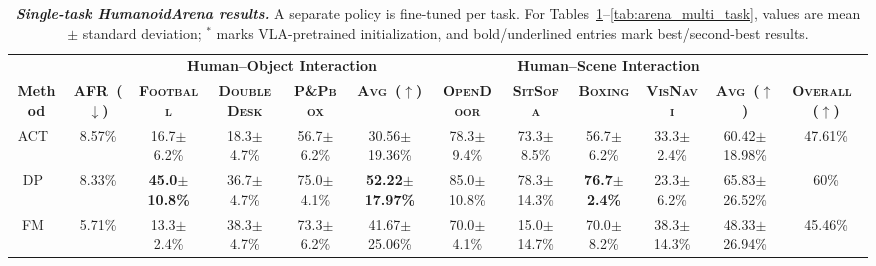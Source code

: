


  




\begin{table}[H]
  \caption{\textbf{\textit{Single-task HumanoidArena results.}} A separate policy is fine-tuned per task. For Tables~\ref{tab:arena_single_task}--\ref{tab:arena_multi_task}, values are mean $\pm$ standard deviation; $^{*}$ marks VLA-pretrained initialization, and bold/underlined entries mark best/second-best results.}
  \label{tab:arena_single_task}
  \centering
  \begin{adjustbox}{max width=\textwidth}
  \setlength{\tabcolsep}{4.2pt}
  \renewcommand{\arraystretch}{1.08}

  \begin{tabular}{cccccc|cccccc}
  \toprule
  & &
  \multicolumn{4}{c|}{\textbf{Human--Object Interaction}} &
  \multicolumn{5}{c}{\textbf{Human--Scene Interaction}} & \\
  \cmidrule(lr){3-6}
  \cmidrule(lr){7-11}

  \multirow{-2}{*}{\textbf{Method}} &
  \multirow{-2}{*}{\textbf{AFR~($\downarrow$)}} &
  \textbf{\textsc{Football}} &
  \textbf{\textsc{DoubleDesk}} &
  \textbf{\textsc{P\&Pbox}} &
  \textbf{\textsc{Avg~($\uparrow$)}} &
  \textbf{\textsc{OpenDoor}} &
  \textbf{\textsc{SitSofa}} &
  \textbf{\textsc{Boxing}} &
  \textbf{\textsc{VisNavi}} &
  \textbf{\textsc{Avg~($\uparrow$)}} &
  \multirow{-2}{*}{\textbf{\textsc{Overall~($\uparrow$)}}} \\
  
  \midrule
  ACT~\cite{ACT}
  & 8.57\%
  & 16.7$\pm$6.2\%
  & 18.3$\pm$4.7\%
  & 56.7$\pm$6.2\%
  & 30.56$\pm$19.36\%
  & 78.3$\pm$9.4\%
  & 73.3$\pm$8.5\%
  & 56.7$\pm$6.2\%
  & 33.3$\pm$2.4\%
  & 60.42$\pm$18.98\%   & 47.61\% \\

  DP~\cite{chi2023diffusionpolicy}
  & 8.33\%
  & \textbf{45.0$\pm$10.8\%}
  & 36.7$\pm$4.7\%
  & 75.0$\pm$4.1\%
  & \textbf{52.22$\pm$17.97\%}
  & 85.0$\pm$10.8\%
  & 78.3$\pm$14.3\%
  & \textbf{76.7$\pm$2.4\%}
  & 23.3$\pm$6.2\%
  & 65.83$\pm$26.52\%   & 60\% \\

  FM~\cite{FM_objective}
  & 5.71\%
  & 13.3$\pm$2.4\%
  & 38.3$\pm$4.7\%
  & 73.3$\pm$6.2\%
  & 41.67$\pm$25.06\%
  & 70.0$\pm$4.1\%
  & 15.0$\pm$14.7\%
  & 70.0$\pm$8.2\%
  & 38.3$\pm$14.3\%
  & 48.33$\pm$26.94\%   & 45.46\% \\


\end{tabular}
\end{adjustbox}
\end{table}
